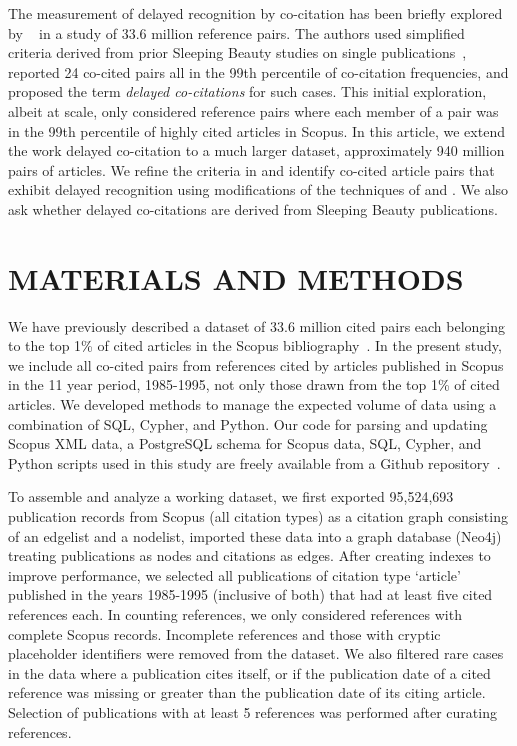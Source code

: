 \documentclass[11pt, oneside]{article}   	%
\begin{document}
The measurement of delayed recognition by co-citation has been briefly explored by ~\cite{devarakonda_2020} in a study of 33.6 million reference pairs. The authors used simplified criteria derived from prior Sleeping Beauty studies on single publications~\citep{Ke2015,Raan2004,Raan2019}, reported 24 co-cited pairs all in the 99th percentile of co-citation frequencies, and proposed the term \emph{delayed co-citations} for such cases. This initial exploration, albeit at scale, only considered reference pairs where each member of a pair was in the 99th percentile of highly cited articles in Scopus.
In this article, we extend the work delayed co-citation to a much larger dataset, approximately 940 million pairs of articles. We refine the criteria in \cite{devarakonda_2020} and identify co-cited article pairs that exhibit delayed recognition using modifications of 
the techniques of \cite{Raan2004,Raan2019} and  \cite{Ke2015}. We also ask whether delayed co-citations are derived from Sleeping Beauty publications.

\section{MATERIALS AND METHODS}

We have previously described a dataset of 33.6 million cited pairs each belonging to the top 1\% of cited articles in the Scopus bibliography~\citep[Figure~2]{devarakonda_2020}. In the present study, we include all co-cited pairs from references cited by articles published in Scopus in the 11 year period, 1985-1995, not only those drawn from the top 1\% of cited articles. We developed methods to manage the expected volume of data using a combination of SQL, Cypher, and Python. Our code for parsing and updating Scopus XML data, a PostgreSQL schema for Scopus data, SQL, Cypher, and Python scripts used in this study are freely available from a Github repository~\citep{Korobskiy2019}.

To assemble and analyze a working dataset, we first exported 95,524,693 publication records from Scopus (all citation types) as a citation graph consisting of an edgelist and a nodelist, imported these data into a graph database (Neo4j) treating publications as nodes and citations as edges. After creating indexes to improve performance, we selected all publications of citation type `article' published in the years 1985-1995 (inclusive of both) that had at least five cited references each. In counting references, we only considered references with complete Scopus records. Incomplete references and those with cryptic placeholder identifiers were removed from the dataset. We also filtered rare cases in the data where a publication cites itself, or if the publication date of a cited reference was missing or greater than the publication date of its citing article. Selection of publications with at least 5 references was performed after curating references.
\end{document}
